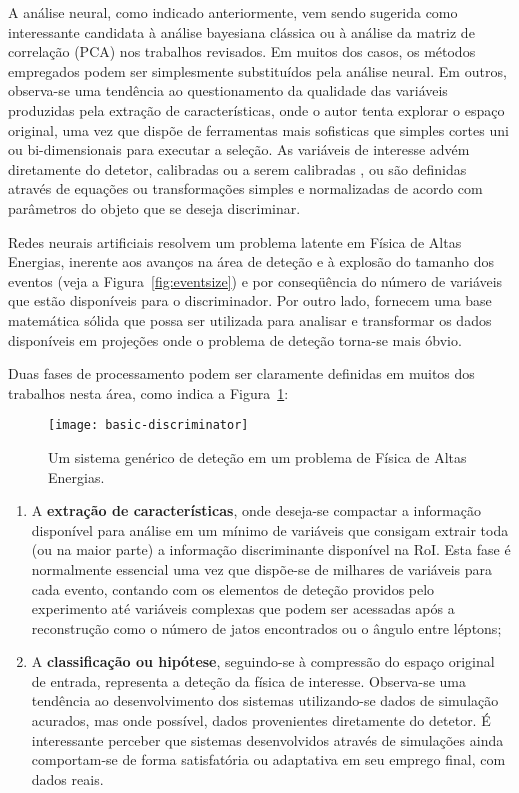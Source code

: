 A análise neural, como indicado anteriormente, vem sendo sugerida como
interessante candidata à análise bayesiana clássica ou à análise da matriz de
correlação (PCA) nos trabalhos revisados. Em muitos dos casos, os métodos
empregados podem ser simplesmente substituídos pela análise neural. Em outros,
observa-se uma tendência ao questionamento da qualidade das variáveis
produzidas pela extração de características, onde o autor tenta explorar o
espaço original, uma vez que dispõe de ferramentas mais sofisticas que simples
cortes uni ou bi-dimensionais para executar a seleção. As variáveis de
interesse advém diretamente do detetor, calibradas ou a serem calibradas
\cite{silva-acat-2001}, ou são definidas através de equações ou transformações
simples e normalizadas de acordo com parâmetros do objeto que se deseja
discriminar.

Redes neurais artificiais resolvem um problema latente em Física de Altas
Energias, inerente aos avanços na área de deteção e à explosão do tamanho dos
eventos (veja a Figura~\ref{fig:eventsize}) e por conseqüência do número de
variáveis que estão disponíveis para o discriminador. Por outro lado, fornecem
uma base matemática sólida que possa ser utilizada para analisar e transformar
os dados disponíveis em projeções onde o problema de deteção torna-se mais
óbvio.

Duas fases de processamento podem ser claramente definidas em muitos dos
trabalhos nesta área, como indica a Figura~\ref{fig:basic-discriminator}:

\begin{figure}
\begin{center}
\texttt{[image: basic-discriminator]}
\end{center}
\caption{Um sistema genérico de deteção em um problema de Física de Altas Energias.}
\label{fig:basic-discriminator}
\end{figure}

\begin{enumerate}
\item A \textbf{extração de características}, onde deseja-se compactar a
informação disponível para análise em um mínimo de variáveis que consigam
extrair toda (ou na maior parte) a informação discriminante disponível na
RoI. Esta fase é normalmente essencial uma vez que dispõe-se de milhares de
variáveis para cada evento, contando com os elementos de deteção providos pelo
experimento até variáveis complexas que podem ser acessadas após a
reconstrução como o número de jatos encontrados ou o ângulo entre léptons;
\item A \textbf{classificação ou hipótese}, seguindo-se à compressão do espaço
original de entrada, representa a deteção da física de interesse. Observa-se
uma tendência ao desenvolvimento dos sistemas utilizando-se dados de simulação
acurados, mas onde possível, dados provenientes diretamente do detetor. É
interessante perceber que sistemas desenvolvidos através de simulações ainda
comportam-se de forma satisfatória ou adaptativa em seu emprego final, com
dados reais.
\end{enumerate}

